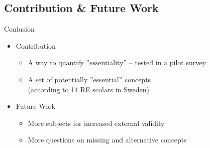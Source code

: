 \documentclass{slides}
\begin{document}
\subsection{Contribution \& Future Work}
\begin{Slide}{Conlusion}

\begin{itemize} 
\item Contribution
\begin{itemize} 
\item A way to quantify ''essentiality'' -- tested in a pilot survey
\item A set of potentially ''essential'' concepts \\ (according to 14 RE scolars in Sweden)
\end{itemize}
\end{itemize}

\begin{itemize} 
\item Future Work
\begin{itemize} 
\item More subjects for increased external validity
\item More questions on missing and alternative concepts
\end{itemize}
\end{itemize}
\end{Slide}
\end{document}
